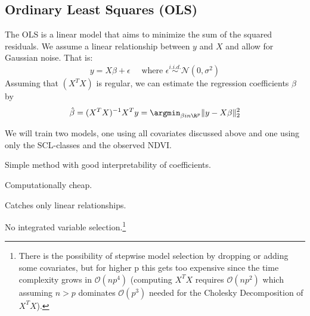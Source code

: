 
\subsection{Ordinary Least Squares (OLS)}{\label{sec:corr_model_OLS}
    The OLS is a linear model that aims to minimize the sum of the squared residuals. We assume a linear relationship between $y$ and $X$ and allow for Gaussian noise. That is:
    \begin{equation}
        \label{eq:ols}
        y = X\beta  + \epsilon \quad \text{ where }\epsilon \overset{i.i.d.}{\sim}\mathcal{N}(0,\sigma^2)
    \end{equation}
    Assuming that $(X^TX)$ is regular, we can estimate the regression coefficients $\beta$ by
    \begin{equation}
        \hat \beta = (X^TX)^{-1}X^Ty = \argmin_{\beta in \R^p}\|y - X\beta\|_2^2 
    \end{equation}

    We will train two models, one using all covariates discussed above and one using only the SCL-classes and the observed NDVI. 

    \begin{my_pros_cons_table}{
        \item Simple method with good interpretability of coefficients.
        \item Computationally cheap.
    }{
        \item Catches only linear relationships.
        \item No integrated variable selection.\footnote{There is the possibility of stepwise model selection by dropping or adding some covariates, but for higher p this gets too expensive since the time complexity grows in $\mathcal{O}(np^4)$ (computing $X^TX$ requires $\mathcal{O}(np^2)$ which assuming $n>p$ dominates $\mathcal{O}(p^3) $ needed for the Cholesky Decomposition of $X^TX$). %
        }
    }
    \end{my_pros_cons_table}
}
